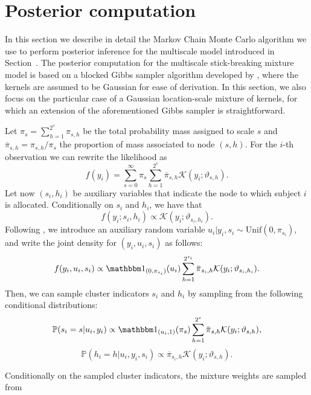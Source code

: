 \documentclass[nonatbib]{elsarticle}
\begin{document}
\section{Posterior computation}\label{sec:posterior-computation}
In this section we describe in detail the Markov Chain Monte Carlo algorithm we use to perform posterior inference for the multiscale model introduced in Section~.
The posterior computation for the multiscale stick-breaking mixture model is based on a blocked Gibbs sampler algorithm developed by \textcite{stefanucci2021}, where the kernels are assumed to be Gaussian for ease of derivation.
In this section, we also focus on the particular case of a Gaussian location-scale mixture of kernels, for which an extension of the aforementioned Gibbs sampler is straightforward.

Let $\pi_s = \sum_{h=1}^{2^{s}}\pi_{s,h}$ be the total probability mass assigned to scale $s$ and $\overbar{\pi}_{s,h} = \pi_{s,h} / \pi_s$ the proportion of mass associated to node $(s,h)$.
For the $i$-th observation we can rewrite the likelihood as
\[
    f(y_i) = \sum_{s=0}^{\infty }\pi_s \sum_{h=1}^{2^{s}} \overbar{\pi}_{s,h} \mathcal{K}(y_i; \vartheta_{s,h}).
\]
 Let now $(s_i, h_i)$ be auxiliary variables that indicate the node to which subject $i$ is allocated.
Conditionally on $s_i$ and $h_i$, we have that
\[
    f(y_i; s_i, h_i) \propto \mathcal{K}(y_i; \vartheta_{s_i, h_i}).
\]
Following \autocite{kalli2011}, we introduce an auxiliary random variable $u_i | y_i, s_i \sim \text{Unif}(0, \pi_{s_i})$, and write the joint density for $(y_i, u_i, s_i)$ as follows:
\[
    f(y_i, u_i, s_i) \propto \one_{(0, \pi_{s_i})}(u_i)  \sum_{h=1}^{2^{s_i}}\overbar{\pi}_{s_i, h} \mathcal{K}(y_i;\vartheta_{s_i, h_i}).
\]
Then, we can sample cluster indicators $s_i$ and $h_i$ by sampling from the following conditional distributions:
\begin{equation}
    \label{eq:gibbsSamplerUpdateClusterS}
    \mathbb{P}(s_i = s | u_i, y_i) \propto \one_{(u_i, 1)}(\pi_{s}) \sum_{h=1}^{2^{s}} \overbar{\pi}_{s,h} \mathcal{K}(y_i ; \vartheta_{s,h}),
\end{equation}
\begin{equation}
    \label{eq:gibbsSamplerUpdateClusterH}
    \mathbb{P}(h_i = h | u_i, y_i, s_i) \propto \overbar{\pi}_{s_i, h} \mathcal{K}(y_i; \vartheta_{s,h}).
\end{equation}

Conditionally on the sampled cluster indicators, the mixture weights are sampled from
\end{document}
